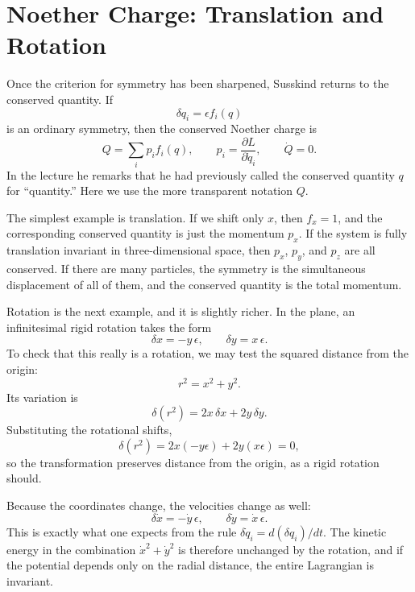 \section{Noether Charge: Translation and Rotation}

Once the criterion for symmetry has been sharpened, Susskind returns to the conserved quantity. If
\[
\delta q_i=\epsilon f_i(q)
\]
is an ordinary symmetry, then the conserved Noether charge is
\begin{equation}
Q=\sum_i p_i f_i(q),
\qquad
p_i=\frac{\partial L}{\partial \dot q_i},
\qquad
\dot Q=0.
\end{equation}
In the lecture he remarks that he had previously called the conserved quantity \(q\) for ``quantity.'' Here we use the more transparent notation \(Q\).

The simplest example is translation. If we shift only \(x\), then \(f_x=1\), and the corresponding conserved quantity is just the momentum \(p_x\). If the system is fully translation invariant in three-dimensional space, then \(p_x\), \(p_y\), and \(p_z\) are all conserved. If there are many particles, the symmetry is the simultaneous displacement of all of them, and the conserved quantity is the total momentum.

Rotation is the next example, and it is slightly richer. In the plane, an infinitesimal rigid rotation takes the form
\begin{equation}
\delta x=-y\,\epsilon,
\qquad
\delta y=x\,\epsilon.
\end{equation}
To check that this really is a rotation, we may test the squared distance from the origin:
\begin{equation}
r^2=x^2+y^2.
\end{equation}
Its variation is
\begin{equation}
\delta(r^2)=2x\,\delta x+2y\,\delta y.
\end{equation}
Substituting the rotational shifts,
\[
\delta(r^2)=2x(-y\epsilon)+2y(x\epsilon)=0,
\]
so the transformation preserves distance from the origin, as a rigid rotation should.

Because the coordinates change, the velocities change as well:
\begin{equation}
\delta \dot x=-\dot y\,\epsilon,
\qquad
\delta \dot y=\dot x\,\epsilon.
\end{equation}
This is exactly what one expects from the rule \(\delta \dot q_i = d(\delta q_i)/dt\). The kinetic energy in the combination \(\dot x^2+\dot y^2\) is therefore unchanged by the rotation, and if the potential depends only on the radial distance, the entire Lagrangian is invariant.

